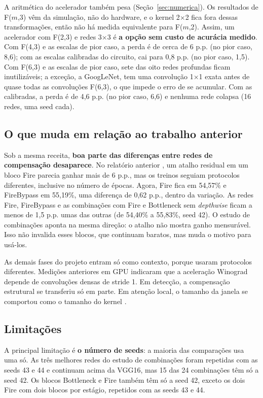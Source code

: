 \documentclass[conference]{IEEEtran}
\newcommand{\by}{\ensuremath{\times}}
\begin{document}
A aritmética do acelerador também pesa (Seção~\ref{sec:numerica}). Os resultados de F($m$,3) vêm da simulação, não do hardware, e o kernel 2\by2
fica fora dessas transformações, então não há medida equivalente para F($m$,2). Assim, um acelerador com F(2,3) e redes 3\by3 é \textbf{a opção sem custo de acurácia medido}. Com F(4,3) e as escalas de pior caso, a perda é de cerca de 6 p.p. (no pior caso, 8,6); com as escalas calibradas do circuito, cai para 0,8 p.p. (no pior caso, 1,5). Com F(6,3) e as escalas de pior caso, sete das oito redes profundas ficam inutilizáveis; a exceção, a GoogLeNet, tem uma convolução 1\by1 exata antes de quase todas as convoluções F(6,3), o que impede o erro de se acumular. Com as calibradas, a perda é de 4,6 p.p. (no pior caso, 6,6) e nenhuma rede colapsa (16 redes, uma seed cada).

\subsection{O que muda em relação ao trabalho anterior}

Sob a mesma receita, \textbf{boa parte das diferenças entre redes de compensação desaparece}. No relatório anterior \cite{souza2026relatorio}, um atalho residual em um bloco Fire \cite{iandola2016squeezenet} parecia ganhar mais de 6 p.p., mas os treinos seguiam protocolos diferentes, inclusive no número de épocas. Agora, Fire fica em 54,57\% e FireBypass em 55,19\%, uma diferença de 0,62 p.p., dentro da variação. As
redes Fire, FireBypass e as combinações com Fire e Bottleneck sem \textit{depthwise} ficam a menos de 1,5 p.p. umas das outras (de 54,40\% a 55,83\%, seed 42). O estudo de combinações aponta na mesma direção: o atalho não mostra ganho mensurável. Isso não invalida esses blocos, que continuam baratos, mas muda o motivo para usá-los.

As demais fases do projeto entram só como contexto, porque usaram protocolos diferentes. Medições anteriores em GPU indicaram que a aceleração Winograd depende de convoluções densas de stride 1. Em detecção, a compensação estrutural se transferiu só em parte. Em atenção local, o tamanho da janela se comportou como o tamanho do kernel \cite{souza2026relatorio}.

\subsection{Limitações}

A principal limitação é \textbf{o número de seeds}: a maioria das comparações usa uma só. As três melhores redes do estudo de combinações foram repetidas com as seeds 43 e 44 e continuam acima da VGG16, mas 15 das 24 combinações têm só a seed 42. Os blocos Bottleneck e Fire também têm só a seed 42, exceto os dois Fire com dois blocos por estágio, repetidos com as seeds 43 e 44.
\end{document}
